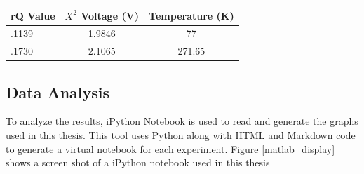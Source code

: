 \begin{table}[h!tb] \centering
{}
\label{exp1_datapoints}
\begin{tabular}{lcc} \hline
\textbf{rQ Value} & \textbf{$X^2$ Voltage (V)} & \textbf{Temperature (K)} \\ \hline
.1139 & 1.9846 & 77 \\
.1730 & 2.1065 & 271.65 \\ \hline
\end{tabular}
\end{table}

\subsection{Data Analysis}\label{Exp1_analysis}

To analyze the results, iPython Notebook is used to read and generate the graphs used in this thesis.  This tool uses Python along with HTML and Markdown code to generate a virtual notebook for each experiment.  Figure \ref{matlab_display} shows a screen shot of a iPython notebook used in this thesis


